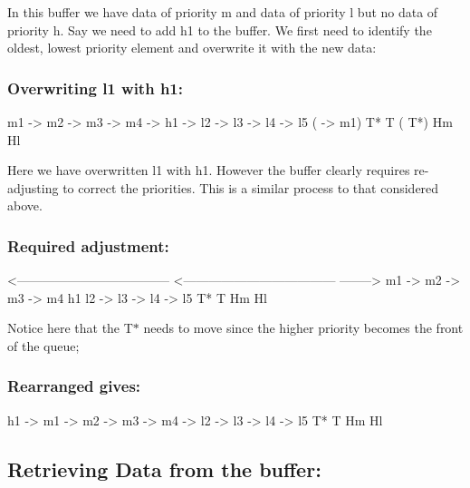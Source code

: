 In this buffer we have data of priority m and data of priority l but no data of priority h. Say we need to add h1 to the buffer. We first need to identify the oldest, lowest priority element and overwrite it with the new data\+:

\subsubsection*{Overwriting l1 with h1\+:}


\begin{DoxyCode}
m1  ->  m2  ->  m3  ->  m4  ->  h1  ->  l2  ->  l3  ->  l4  ->   l5  (  ->  m1)
T*                                                               T   (      T*)
                        Hm                                       Hl
\end{DoxyCode}


Here we have overwritten l1 with h1. However the buffer clearly requires re-\/adjusting to correct the priorities. This is a similar process to that considered above.

\subsubsection*{Required adjustment\+:}


\begin{DoxyCode}
                             <------------------------------------
<------------------------------------
                            -------->
m1  ->  m2  ->  m3  ->  m4      h1      l2  ->  l3  ->  l4  ->   l5
T*                                                               T
                        Hm                                       Hl
\end{DoxyCode}


Notice here that the T$\ast$ needs to move since the higher priority becomes the front of the queue;

\subsubsection*{Rearranged gives\+:}


\begin{DoxyCode}
h1  ->  m1  ->  m2  ->  m3  ->  m4  ->  l2  ->  l3  ->  l4  ->   l5
T*                                                               T
                                Hm                               Hl
\end{DoxyCode}


\subsection*{Retrieving Data from the buffer\+:}

